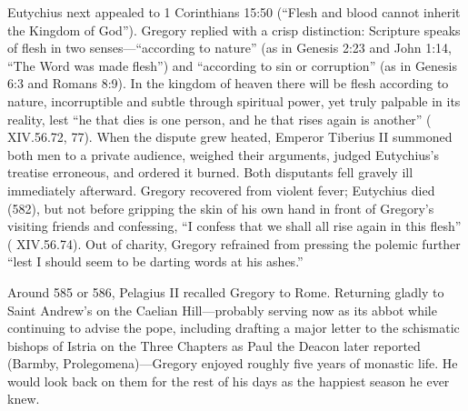 Eutychius next appealed to 1 Corinthians 15:50 (``Flesh and blood cannot
inherit the Kingdom of God''). Gregory replied with a crisp distinction:
Scripture speaks of flesh in two senses---``according to nature'' (as in
Genesis 2:23 and John 1:14, ``The Word was made flesh'') and ``according to sin
or corruption'' (as in Genesis 6:3 and Romans 8:9). In the kingdom of heaven
there will be flesh according to nature, incorruptible and subtle through
spiritual power, yet truly palpable in its reality, lest ``he that dies is one
person, and he that rises again is another'' ( XIV.56.72, 77).
When the dispute grew heated, Emperor Tiberius II summoned both men to a
private audience, weighed their arguments, judged Eutychius's treatise
erroneous, and ordered it burned. Both disputants fell gravely ill immediately
afterward. Gregory recovered from violent fever; Eutychius died (582), but not
before gripping the skin of his own hand in front of Gregory's visiting friends
and confessing, ``I confess that we shall all rise again in this flesh''
( XIV.56.74). Out of charity, Gregory refrained from pressing the
polemic further ``lest I should seem to be darting words at his ashes.''

Around 585 or 586, Pelagius II recalled Gregory to Rome. Returning gladly to
Saint Andrew's on the Caelian Hill---probably serving now as its abbot while
continuing to advise the pope, including drafting a major letter to the
schismatic bishops of Istria on the Three Chapters as Paul the Deacon later
reported (Barmby, Prolegomena)---Gregory enjoyed roughly five years of monastic
life. He would look back on them for the rest of his days as the happiest
season he ever knew.
